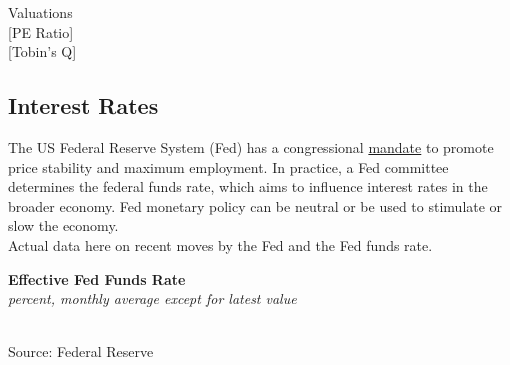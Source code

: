 \documentclass{report}
\makeatletter
\newcommand{\tbllink}[1]{\href{https://raw.githubusercontent.com/bdecon/US-chartbook/master/chartbook/data/#1}{\faTable}}
\newcommand*\short[1]{\expandafter\@gobbletwo\number\numexpr#1\relax}
\newcommand{\dateaxisticks}{
		date coordinates in=x, axis line style={draw=none},
		xmax={2020-02-01},
		max space between ticks=40,	    
		xtick={{1990-01-01}, {1992-01-01}, {1994-01-01}, 
			{1996-01-01}, {1998-01-01}, {2000-01-01}, 
			{2002-01-01}, {2004-01-01}, {2006-01-01},
			{2008-01-01}, {2010-01-01}, {2012-01-01}, {2014-01-01},
		    {2016-01-01}, {2018-01-01}, {2020-01-01}},
		minor xtick={{1989-01-01}, {1991-01-01}, {1993-01-01},
			{1995-01-01}, {1997-01-01}, {1999-01-01}, 
			{2001-01-01}, {2003-01-01}, {2005-01-01}, {2007-01-01},
		    {2009-01-01}, {2011-01-01}, {2013-01-01}, {2015-01-01},
		    {2017-01-01}, {2019-01-01}},
		enlarge y limits={0.06}, enlarge x limits={0.01},
		}
\newcommand{\bbar}[2]{extra #1 ticks = {{#2}}, extra #1 tick labels = ,
		extra #1 tick style = {grid=major, grid style={thick, black!25}},}
\newcommand{\stdline}[4]{\addplot[very thick, no markers, color=#1] 
		table [x=#2, y=#3, col sep=comma] {#4};	}
\newcommand{\rbars}{
		\fill[color=black!10] (axis cs:{1990-07-01},\pgfkeysvalueof{/pgfplots/ymin}) rectangle 
			(axis cs:{1991-03-01}, \pgfkeysvalueof{/pgfplots/ymax});
		\fill[color=black!10] (axis cs:{2007-12-01},\pgfkeysvalueof{/pgfplots/ymin}) rectangle 
			(axis cs:{2009-07-01}, \pgfkeysvalueof{/pgfplots/ymax});
		\fill[color=black!10] (axis cs:{2001-03-01},\pgfkeysvalueof{/pgfplots/ymin}) rectangle 
			(axis cs:{2001-11-01}, \pgfkeysvalueof{/pgfplots/ymax});}
\makeatother
\begin{document}
{{{{\begin{minipage}{0.76\textwidth}
\normalsize

Valuations \\

\hspace{4mm} [PE Ratio]\\

\hspace{4mm} [Tobin's Q]

\end{minipage}

\newpage

\begin{minipage}{0.76\textwidth}

\subsection*{\color{black!70} \seriffont Interest Rates}

\vspace{4mm}

\small The US Federal Reserve System (Fed) has a congressional \href{https://www.federalreserve.gov/faqs/money_12848.htm}{mandate} to promote price stability and maximum employment. In practice, a Fed committee determines the federal funds rate, which aims to influence interest rates in the broader economy. Fed monetary policy can be neutral or be used to stimulate or slow the economy.\\

Actual data here on recent moves by the Fed and the Fed funds rate. \\

\vspace{1mm}

\noindent \normalsize \textbf{Effective Fed Funds Rate}\\
\footnotesize{\textit{percent, monthly average except for latest value }}\\ 
\noindent \hspace*{-2mm} \\
\footnotesize{Source: Federal Reserve} \hfill \tbllink{rates.csv}\\

\vspace{4mm}


\end{minipage}}}}}
\end{document}

